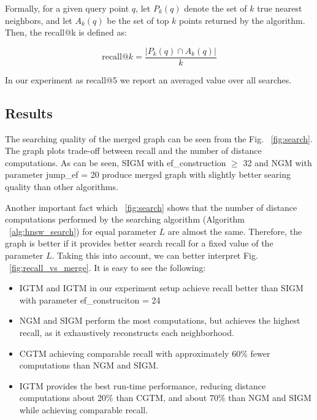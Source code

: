 \documentclass{article}
\begin{document}
Formally, for a given query point \(q\), let \(P_k(q)\) denote the set of \(k\) true nearest neighbors, and let \(A_k(q)\) be the set of top \(k\) points returned by the algorithm. Then, the recall@k is defined as:

\[
\text{recall@}k = \frac{|P_k(q) \cap A_k(q)|}{k}
\]

In our experiment as recall@5 we report an averaged value over all searches. 

\subsection{Results}

The searching quality of the merged graph can be seen from the Fig. ~\ref{fig:search}. The graph plots trade-off between recall and the number of distance computations. As can be seen, \textsc{SIGM} with ef\_construction $\ge$ 32 and \textsc{NGM} with parameter jump\_ef = 20 produce merged graph with slightly better searing quality than other algorithms.

Another important fact which ~\ref{fig:search} shows that the number of distance computations performed by the searching algorithm (Algorithm ~\ref{alg:hnsw_search}) for equal parameter $L$ are almost the same.  Therefore, the graph is better if it provides better search recall for a fixed value of the parameter $L$. Taking this into account, we can better interpret Fig. ~\ref{fig:recall_vs_merge}. It is easy to see the following:  

\begin{itemize}
    \item\textsc{IGTM} and \textsc{IGTM}  in our experiment setup  achieve recall better than \textsc{SIGM} with parameter ef\_construciton = 24
    \item \textsc{NGM} and \textsc{SIGM} perform the most computations, but achieves the highest recall, as it exhaustively reconstructs each neighborhood.
    \item \textsc{CGTM} achieving comparable recall with approximately 60\% fewer computations than \textsc{NGM} and \textsc{SIGM}.
    \item \textsc{IGTM} provides the best run-time performance, reducing distance computations about 20\% than \textsc{CGTM}, and about 70\% than \textsc{NGM} and \textsc{SIGM} while achieving comparable recall.
\end{itemize}

\end{document}
